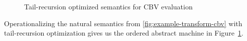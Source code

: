 \begin{figure}
\caption{Tail-recursion optimized semantics for CBV
  evaluation}
\label{fig:cbv-ev-ssos-tail}
\end{figure}

Operationalizing the natural semantics from
\ref{fig:example-transform-cbv} with tail-recursion optimization gives
us the ordered abstract machine in Figure~\ref{fig:cbv-ev-ssos-tail}.






